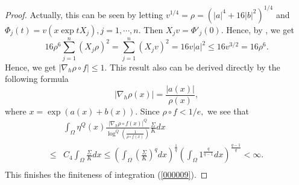\documentclass[11pt,twoside]{article}
\theoremstyle{definition}
\theoremstyle{remark}
\begin{document}
\begin{proof}
Actually,  this can be seen by letting $v^{1/4}=\rho=\left(\vert a\vert^{4}+16\vert b\vert^{2}\right)^{1/4}$ and $\Phi_{j}(t)=v(x\exp tX_{j}),j=1,\cdots,n.$ Then $X_{j}v=\Phi'_{j}(0).$ Hence, by \cite[(15)]{Kap80}, we get
$$16\rho^{6}\sum_{j=1}^{n}(X_{j}\rho)^{2}=\sum_{j=1}^{n}(X_{j}v)^{2}=16v\vert a\vert^{2}\leq16 v^{3/2}=16\rho^{6}.$$
Hence, we get $\vert \nabla_{h}\rho\circ f\vert\leq 1.$ This result also can be derived directly by the following formula \cite[Proposition 3.2.16]{Ing10}
\begin{equation}\label{0707}
\vert\nabla_{h}\rho(x)\vert=\frac{\vert a(x)\vert}{\rho(x)},
\end{equation}
where $x=\exp\left(a(x)+b(x)\right).$   Since $\rho\circ f<1/e,$ we see that
\begin{equation}\label{05}
\begin{aligned}
&\int_{\Omega}\eta^{Q}(x)\frac{\vert\nabla_{h}\rho\circ f(x)\vert^{Q}}{\log^{Q}(\frac{1}{\rho\circ f(x)})}\frac{\Sigma}{K}dx\\
\leq& C_{4}\int_{\Omega}\frac{\Sigma}{K}dx\leq\left(\int_{\Omega}\left(\frac{\Sigma}{K}\right)^{q}dx\right)^{\frac{1}{q}}\left(\int_{\Omega}1^{\frac{q}{q-1}}dx\right)^{\frac{q-1}{q}}<\infty. \\
\end{aligned}
\end{equation}
This finishes the finiteness of integration (\ref{000009}).






\end{proof}
\end{document}
